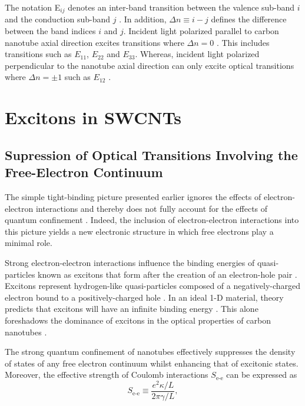 The notation E$_{ij}$ denotes an inter-band transition between the valence sub-band $i$ and the conduction sub-band $j$ \cite{weismanKonoBook}. In addition, $\Delta n \equiv i - j$ defines the difference between the band indices $i$ and $j$.  Incident light polarized parallel to carbon nanotube axial direction excites transitions where $\Delta n = 0$ \cite{weismanKonoBook}. This includes transitions such as $E_{11}$, $E_{22}$ and $E_{33}$. Whereas, incident light polarized perpendicular to the nanotube axial direction can only excite optical transitions where $\Delta n = \pm 1$ such as $E_{12}$ \cite{weismanKonoBook}.



\section{Excitons in SWCNTs}

\subsection{Supression of Optical Transitions Involving the Free-Electron Continuum}
The simple tight-binding picture presented earlier ignores the effects of electron-electron interactions and thereby does not fully account for the effects of quantum confinement \cite{weismanKonoBook}. Indeed, the inclusion of electron-electron interactions into this picture yields a new electronic structure in which free electrons play a minimal role.

Strong electron-electron interactions influence the binding energies of quasi-particles known as excitons that form after the creation of an electron-hole pair \cite{koch2006semiconductor}. Excitons represent hydrogen-like quasi-particles composed of a negatively-charged electron bound to a positively-charged hole \cite{koch2006semiconductor}. In an ideal 1-D material, theory predicts that excitons will have an infinite binding energy \cite{ando2005theory}. This alone foreshadows the dominance of excitons in the optical properties of carbon nanotubes \cite{ando2005theory}.



The strong quantum confinement of nanotubes effectively suppresses the density of states of any free electron continuum whilst enhancing that of excitonic states. Moreover, the effective strength of Coulomb interactions $S_\text{e-e}$ can be expressed as
\begin{equation}
	S_\text{e-e} \equiv \dfrac{e^2 \kappa / L}{2 \pi \gamma / L},
\end{equation}

